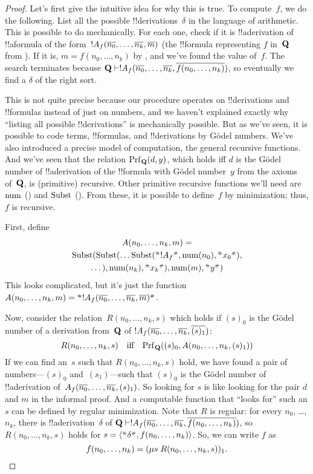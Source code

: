 \documentclass[../../../include/open-logic-section]{subfiles}
\begin{document}
\begin{proof}
Let's first give the intuitive idea for why this is true. To
compute~$f$, we do the following.  List all the possible
!!{derivation}s~$\delta$ in the language of arithmetic. This is
possible to do mechanically. For each one, check if it is
!!a{derivation} of !!a{formula} of the form~$!A_f(\overline{n_0}, \dots,
\overline{n_k}, \overline{m})$ (the !!{formula} representing $f$ in~$\mathbf{Q}$
from ). If it is, $m = f(n_0, \dots, n_k)$ by
, and we've found the value of~$f$. The search
terminates because $\Th{Q} \Proves !A_f(\num{n_0}, \dots, \num{n_k},
\num{f(n_0, \dots, n_k)})$, so eventually we find a $\delta$ of the
right sort.

This is not quite precise because our procedure operates on
!!{derivation}s and !!{formula}s instead of just on numbers, and we
haven't explained exactly why ``listing all possible !!{derivation}s''
is mechanically possible.  But as we've seen, it is possible to code
terms, !!{formula}s, and !!{derivation}s by G\"odel numbers. We've
also introduced a precise model of computation, the general recursive
functions. And we've seen that the relation $\Prf[\Th{Q}](d,y)$, which
holds iff $d$ is the G\"odel number of !!a{derivation} of the !!{formula}
with G\"odel number~$y$ from the axioms of~$\mathbf{Q}$, is (primitive)
recursive. Other primitive recursive functions we'll need are
$\mathrm{num}$ () and $\mathrm{Subst}$
().  From these, it is possible to
define~$f$ by minimization; thus, $f$ is recursive.

First, define
\begin{multline*}
  A(n_0, \dots, n_k, m) = \\
  \fn{Subst}(\fn{Subst}(\dots\fn{Subst}(\Gn{!A_f}, \fn{num}(n_0), \Gn{x_0}),\\ \dots),
  \fn{num}(n_k),  \Gn{x_k}), \fn{num}(m), \Gn{y})
\end{multline*}
This looks complicated, but it's just the function $A(n_0, \dots, n_k,
m) = \Gn{!A_f(\num{n_0}, \dots, \num{n_k}, \num{m})}$.

Now, consider the relation~$R(n_0, \dots, n_k, s)$ which holds if
$(s)_0$ is the G\"odel number of a derivation from~$\mathbf{Q}$ of
$!A_f(\overline{n_0}, \dots, \overline{n_k}, \overline{(s)_1})$:
\[
R(n_0, \dots, n_k, s) \quad\text{iff}\quad \Prf[\Th{Q}]((s)_0, A(n_0,
\dots, n_k, (s)_1))
\]
If we can find an~$s$ such that $R(n_0, \dots, n_k, s)$ hold, we have
found a pair of numbers---$(s)_0$ and~$(s_1)$---such that $(s)_0$ is
the G\"odel number of !!a{derivation} of~$A_f(\overline{n_0}, \dots,
\overline{n_k}, (s)_1)$. So looking for $s$ is like looking for the pair
$d$ and $m$ in the informal proof.  And a computable function that
``looks for'' such an $s$ can be defined by regular minimization.
Note that $R$ is regular: for every $n_0$, \dots, $n_k$, there is
!!a{derivation}~$\delta$ of $\Th{Q} \Proves !A_f(\num{n_0}, \dots,
\num{n_k}, \num{f(n_0, \dots, n_k)})$, so $R(n_0, \dots, n_k, s)$
holds for $s = \tuple{\Gn{\delta}, f(n_0, \dots, n_k)}$.  So, we can
write $f$ as
\[
f(n_0,\dots,n_{k}) = (\mu s \; R(n_0, \dots, n_k, s))_1.
\]
\end{proof}
\end{document}
